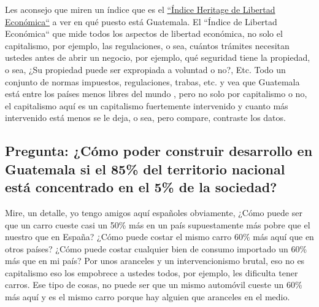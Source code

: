 Les aconsejo que miren un índice que es el \href{https://en.wikipedia.org/wiki/Index_of_Economic_Freedom}{``Índice Heritage de Libertad Económica``} a ver en qué puesto está Guatemala. El ``Índice de Libertad Económica`` que mide todos los aspectos de libertad económica, no solo el capitalismo, por ejemplo, las regulaciones, o sea, cuántos trámites necesitan ustedes antes de abrir un negocio, por ejemplo, qué seguridad tiene la propiedad, o sea, ¿Su propiedad puede ser expropiada a voluntad o no?, Etc. Todo un conjunto de normas impuestos, regulaciones, trabas, etc. y vea que Guatemala está entre los países menos libres del mundo , pero no solo por capitalismo o no, el capitalismo aquí es un capitalismo fuertemente intervenido y cuanto más intervenido está menos se le deja, o sea, pero compare, contraste los datos.

\subsection{Pregunta: ¿Cómo poder construir desarrollo en Guatemala si el 85\% del territorio nacional está concentrado en el 5\% de la sociedad?}

Mire, un detalle, yo tengo amigos aquí españoles obviamente, ¿Cómo puede ser que un carro cueste casi un 50\% más en un país supuestamente más pobre que el nuestro que en España? ¿Cómo puede costar el mismo carro 60\% más aquí que en otros países? ¿Cómo puede costar cualquier bien de consumo importado un 60\% más que en mi país? Por unos aranceles y un intervencionismo brutal, eso no es capitalismo eso los empobrece a ustedes todos, por ejemplo, les dificulta tener carros. Ese tipo de cosas, no puede ser que un mismo automóvil cueste un 60\% más aquí y es el mismo carro porque hay alguien que aranceles en el medio.
